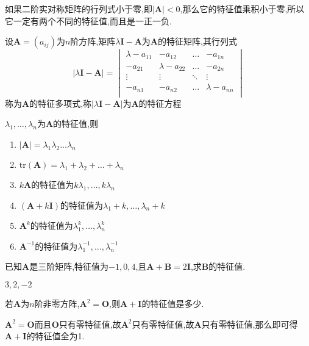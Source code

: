 如果二阶实对称矩阵的行列式小于零,即$\left\lvert \mathbf{A}\right\rvert <0$,那么它的特征值乘积小于零,所以它一定有两个不同的特征值,而且是一正一负.

\begin{definition}
    设$\mathbf{A}=(a_{ij})$为$n$阶方阵,矩阵$\lambda\mathbf{I}-\mathbf{A}$为$\mathbf{A}$的特征矩阵,其行列式
    \begin{equation*}
        \left\lvert \lambda\mathbf{I}-\mathbf{A}\right\rvert =
        \begin{vmatrix}
            \lambda-a_{11}   &   -a_{12}   &   \dots   &   -a_{1n}   \\
            -a_{21}   &   \lambda-a_{22}   &   \dots   &   -a_{2n}   \\
            \vdots   &   \vdots   &   \ddots   &   \vdots   \\
            -a_{n1}   &   -a_{n2}   &   \dots   &   \lambda-a_{nn}   \\
            \end{vmatrix}
    \end{equation*}
    称为$\mathbf{A}$的特征多项式,称$\left\lvert \lambda\mathbf{I}-\mathbf{A}\right\rvert $为$\mathbf{A}$的特征方程
\end{definition}


$\lambda_1,\dots,\lambda_n$为$\mathbf{A}$的特征值,则
\begin{enumerate}
    \item $\vert \mathbf{A} \vert =\lambda_1\lambda_2\dots\lambda_n $
    \item $\mathrm{tr}(\mathbf{A})=\lambda_1+\lambda_2+\dots+\lambda_n$
    \item $k\mathbf{A}$的特征值为$k\lambda_1,\dots,k\lambda_n$
    \item $(\mathbf{A}+k\mathbf{I})$的特征值为$\lambda_1+k,\dots,\lambda_n+k$
    \item $\mathbf{A}^k$的特征值为$\lambda_1^k,\dots,\lambda_n^k$
    \item $\mathbf{A}^{-1}$的特征值为$\lambda_1^{-1},\dots,\lambda_n^{-1}$
\end{enumerate}

\begin{examp}{已知$\mathbf{A}$是三阶矩阵,特征值为$-1,0,4$,且$\mathbf{A}+\mathbf{B}=2\mathbf{I}$,求$\mathbf{B}$的特征值.}

    \jie 
    $3,2,-2$
\end{examp}

\begin{examp}{若$\mathbf{A}$为$n$阶非零方阵,$\mathbf{A}^2=\mathbf{O}$,则$\mathbf{A}+\mathbf{I}$的特征值是多少.}
    
    \jie $\mathbf{A}^2=\mathbf{O}$而且$\mathbf{O}$只有零特征值,故$\mathbf{A}^2$只有零特征值,故$\mathbf{A}$只有零特征值,那么即可得$\mathbf{A}+\mathbf{I}$的特征值全为1.
\end{examp}

